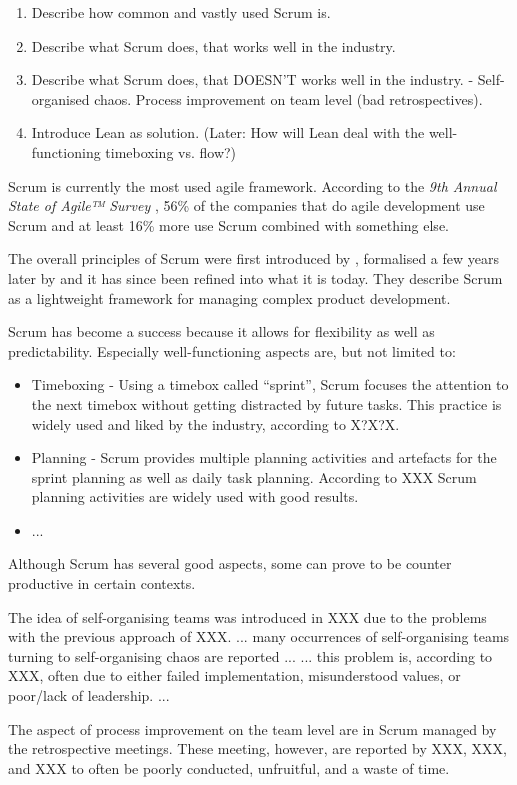 \begin{enumerate}
	\item Describe how common and vastly used Scrum is.
	\item Describe what Scrum does, that works well in the industry.
	\item Describe what Scrum does, that DOESN'T works well in the industry. - Self-organised chaos. Process improvement on team level (bad retrospectives).
	\item Introduce Lean as solution. (Later: How will Lean deal with the well-functioning timeboxing vs. flow?)
\end{enumerate}

Scrum is currently the most used agile framework. According to the \textit{9th Annual State of Agile™ Survey} \citep{VersionOne}, 56\% of the companies that do agile development use Scrum and at least 16\% more use Scrum combined with something else.

The overall principles of Scrum were first introduced by \citet{Takeuchi1986}, formalised a few years later by \citet{Schwaber} and it has since been refined into what it is today.
They describe Scrum as a lightweight framework for managing complex product development. 

Scrum has become a success because it allows for flexibility as well as predictability.
Especially well-functioning aspects are, but not limited to:
\begin{itemize}
	\item Timeboxing - Using a timebox called “sprint”, Scrum focuses the attention to the next timebox without getting distracted by future tasks. This practice is widely used and liked by the industry, according to X?X?X.
	\item Planning - Scrum provides multiple planning activities and artefacts for the sprint planning as well as daily task planning. According to XXX Scrum planning activities are widely used with good results.
	\item ...
\end{itemize}

Although Scrum has several good aspects, some can prove to be counter productive in certain contexts.
 
The idea of self-organising teams was introduced in XXX due to the problems with the previous approach of XXX.
... many occurrences of self-organising teams turning to self-organising chaos are reported ...
... this problem is, according to XXX, often due to either failed implementation, misunderstood values, or poor/lack of leadership. ...

The aspect of process improvement on the team level are in Scrum managed by the retrospective meetings. These meeting, however, are reported by XXX, XXX, and XXX to often be poorly conducted, unfruitful, and a waste of time. 

